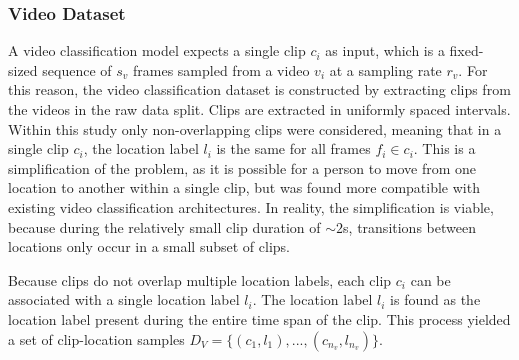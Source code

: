 \documentclass[a4paper]{article}
\begin{document}
\subsubsection{Video Dataset} %

A video classification model expects a single clip $c_i$ as input, which is a
fixed-sized sequence of $s_v$ frames sampled from a video $v_i$ at a sampling
rate $r_v$. For this reason, the video classification dataset is constructed by
extracting clips from the videos in the raw data split. Clips are extracted in
uniformly spaced intervals. Within this study only non-overlapping clips were
considered, meaning that in a single clip $c_i$, the location label $l_i$ is the
same for all frames $f_i \in c_i$. This is a simplification of the problem, as
it is possible for a person to move from one location to another within a single
clip, but was found more compatible with existing video classification
architectures. In reality, the simplification is viable, because during the
relatively small clip duration of $\sim 2$s, transitions between locations only
occur in a small subset of clips.

Because clips do not overlap multiple location labels, each clip $c_i$ can be
associated with a single location label $l_i$. The location label $l_i$ is found
as the location label present during the entire time span of the clip. This
process yielded a set of clip-location samples $D_V = \{(c_1, l_1), ...,
(c_{n_v}, l_{n_v})\}$.
\end{document}
